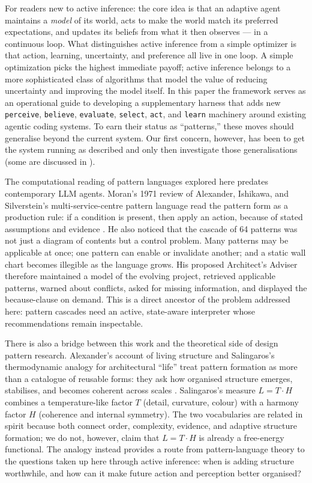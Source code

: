 For readers new to active inference: the core idea is that an adaptive agent maintains a \emph{model} of its world, acts to make the world match its preferred expectations, and updates its beliefs from what it then observes --- in a continuous loop.  What distinguishes active inference from a simple optimizer is that action, learning, uncertainty, and preference all live in one loop.  A simple optimization picks the highest immediate payoff; active inference belongs to a more sophisticated class of algorithms that model the value of reducing uncertainty and improving the model itself.  In this paper the framework serves as an operational guide to developing a supplementary harness that adds new \texttt{perceive}, \texttt{believe}, \texttt{evaluate}, \texttt{select}, \texttt{act}, and \texttt{learn} machinery around existing agentic coding systems.  \xglossarynote{}  To earn their status as ``patterns,'' these moves should generalise beyond the current system.  Our first concern, however, has been to get the system running as described and only then investigate those generalisations (some are discussed in \xfuturework{}).

The computational reading of pattern languages explored here predates contemporary LLM agents.  Moran's 1971 review of Alexander, Ishikawa, and Silverstein's multi-service-centre pattern language read the pattern form as a production rule: if a condition is present, then apply an action, because of stated assumptions and evidence \cite{moran1971artificial}.  He also noticed that the cascade of 64 patterns was not just a diagram of contents but a control problem.  Many patterns may be applicable at once; one pattern can enable or invalidate another; and a static wall chart becomes illegible as the language grows.  His proposed Architect's Adviser therefore maintained a model of the evolving project, retrieved applicable patterns, warned about conflicts, asked for missing information, and displayed the because-clause on demand.  This is a direct ancestor of the problem addressed here: pattern cascades need an active, state-aware interpreter whose recommendations remain inspectable.

There is also a bridge between this work and the theoretical side of design pattern research.  Alexander's account of living structure and Salingaros's thermodynamic analogy for architectural ``life'' treat pattern formation as more than a catalogue of reusable forms: they ask how organised structure emerges, stabilises, and becomes coherent across scales \cite{alexander1999a,salingaros1997life}.  Salingaros's measure $L=T\cdot H$ combines a temperature-like factor $T$ (detail, curvature, colour) with a harmony factor $H$ (coherence and internal symmetry).  The two vocabularies are related in spirit because both connect order, complexity, evidence, and adaptive structure formation; we do not, however, claim that $L=T\cdot H$ is already a free-energy functional.  The analogy instead provides a route from pattern-language theory to the questions taken up here through active inference: when is adding structure worthwhile, and how can it make future action and perception better organised?
